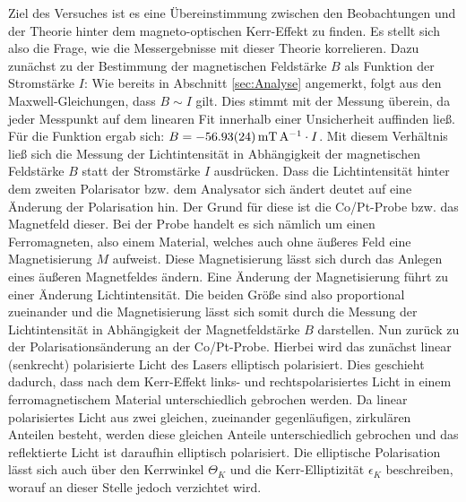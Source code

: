 	Ziel des Versuches ist es eine Übereinstimmung zwischen den Beobachtungen und der Theorie hinter dem magneto-optischen Kerr-Effekt zu finden.
	Es stellt sich also die Frage, wie die Messergebnisse mit dieser Theorie korrelieren.
	Dazu zunächst zu der Bestimmung der magnetischen Feldstärke $B$ als Funktion der Stromstärke $I$:
	Wie bereits in Abschnitt \ref{sec:Analyse} angemerkt, folgt aus den Maxwell-Gleichungen, dass $B\sim I$ gilt.
	Dies stimmt mit der Messung überein, da jeder Messpunkt auf dem linearen Fit innerhalb einer Unsicherheit auffinden ließ.
	Für die Funktion ergab sich: $B = \SI{-56.93+-0.24}{\milli\tesla\per\ampere}\cdot I$.
	Mit diesem Verhältnis ließ sich die Messung der Lichtintensität in Abhängigkeit der magnetischen Feldstärke $B$ statt der Stromstärke $I$ ausdrücken.
	Dass die Lichtintensität hinter dem zweiten Polarisator bzw. dem Analysator sich ändert deutet auf eine Änderung der Polarisation hin.
	Der Grund für diese ist die Co/Pt-Probe bzw. das Magnetfeld dieser.
	Bei der Probe handelt es sich nämlich um einen Ferromagneten, also einem Material, welches auch ohne äußeres Feld eine Magnetisierung $M$ aufweist.
	Diese Magnetisierung lässt sich durch das Anlegen eines äußeren Magnetfeldes ändern.
	Eine Änderung der Magnetisierung führt zu einer Änderung Lichtintensität.
	Die beiden Größe sind also proportional zueinander und die Magnetisierung lässt sich somit durch die Messung der Lichtintensität in Abhängigkeit der Magnetfeldstärke $B$ darstellen.
	Nun zurück zu der Polarisationsänderung an der Co/Pt-Probe.
	Hierbei wird das zunächst linear (senkrecht) polarisierte Licht des Lasers elliptisch polarisiert.
	Dies geschieht dadurch, dass nach dem Kerr-Effekt links- und rechtspolarisiertes Licht in einem ferromagnetischem Material unterschiedlich gebrochen werden.
	Da linear polarisiertes Licht aus zwei gleichen, zueinander gegenläufigen, zirkulären Anteilen besteht, werden diese gleichen Anteile unterschiedlich gebrochen und das reflektierte Licht ist daraufhin elliptisch polarisiert.
	Die elliptische Polarisation lässt sich auch über den Kerrwinkel $\Theta_K$ und die Kerr-Elliptizität $\epsilon_K$ beschreiben, worauf an dieser Stelle jedoch verzichtet wird.
	

